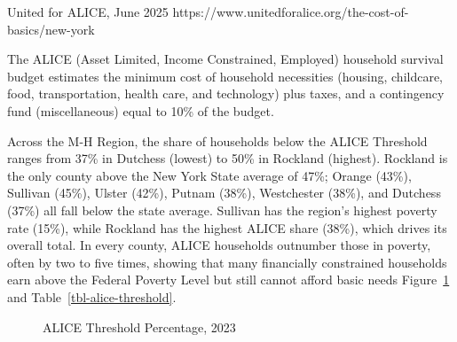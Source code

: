 \documentclass[
  english,
  letterpaper,
]{report}
\begin{document}
\begin{tcolorbox}[enhanced jigsaw, breakable, leftrule=.75mm, title=\textcolor{quarto-callout-note-color}{\faInfo}\hspace{0.5em}{Source}, bottomrule=.15mm, opacityback=0, left=2mm, colback=white, bottomtitle=1mm, coltitle=black, colbacktitle=quarto-callout-note-color!10!white, colframe=quarto-callout-note-color-frame, opacitybacktitle=0.6, toptitle=1mm, titlerule=0mm, arc=.35mm, rightrule=.15mm, toprule=.15mm]

United for ALICE, June 2025
https://www.unitedforalice.org/the-cost-of-basics/new-york

\end{tcolorbox}

\begin{tcolorbox}[enhanced jigsaw, breakable, leftrule=.75mm, title=\textcolor{quarto-callout-note-color}{\faInfo}\hspace{0.5em}{Note}, bottomrule=.15mm, opacityback=0, left=2mm, colback=white, bottomtitle=1mm, coltitle=black, colbacktitle=quarto-callout-note-color!10!white, colframe=quarto-callout-note-color-frame, opacitybacktitle=0.6, toptitle=1mm, titlerule=0mm, arc=.35mm, rightrule=.15mm, toprule=.15mm]

The ALICE (Asset Limited, Income Constrained, Employed) household
survival budget estimates the minimum cost of household necessities
(housing, childcare, food, transportation, health care, and technology)
plus taxes, and a contingency fund (miscellaneous) equal to 10\% of the
budget.

\end{tcolorbox}

Across the M-H Region, the share of households below the ALICE Threshold
ranges from 37\% in Dutchess (lowest) to 50\% in Rockland (highest).
Rockland is the only county above the New York State average of 47\%;
Orange (43\%), Sullivan (45\%), Ulster (42\%), Putnam (38\%),
Westchester (38\%), and Dutchess (37\%) all fall below the state
average. Sullivan has the region's highest poverty rate (15\%), while
Rockland has the highest ALICE share (38\%), which drives its overall
total. In every county, ALICE households outnumber those in poverty,
often by two to five times, showing that many financially constrained
households earn above the Federal Poverty Level but still cannot afford
basic needs Figure~\ref{fig-alice-threshold} and
Table~\ref{tbl-alice-threshold}.

\begin{figure}


\caption{\label{fig-alice-threshold}ALICE Threshold Percentage, 2023}

\end{figure}%
\end{document}
